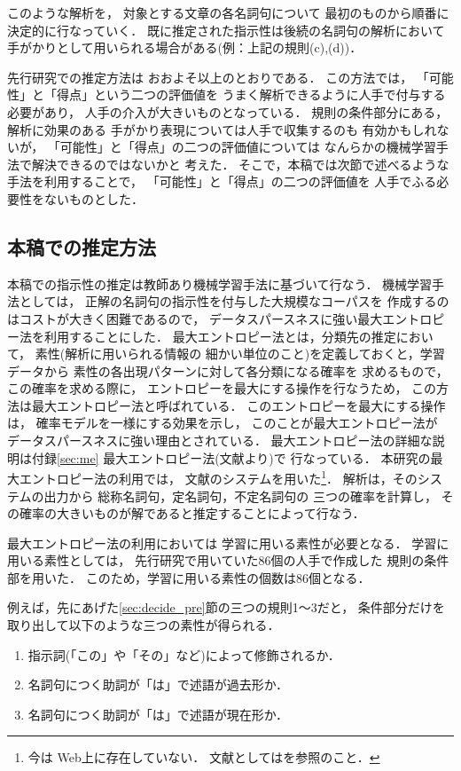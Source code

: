このような解析を，
対象とする文章の各名詞句について
最初のものから順番に決定的に行なっていく．
既に推定された指示性は後続の名詞句の解析において
手がかりとして用いられる場合がある(例：上記の規則(c),(d))．

先行研究での推定方法は
おおよそ以上のとおりである．
この方法では，
「可能性」と「得点」という二つの評価値を
うまく解析できるように人手で付与する必要があり，
人手の介入が大きいものとなっている．
規則の条件部分にある，解析に効果のある
手がかり表現については人手で収集するのも
有効かもしれないが，
「可能性」と「得点」の二つの評価値については
なんらかの機械学習手法で解決できるのではないかと
考えた．
そこで，本稿では次節で述べるような手法を利用することで，
「可能性」と「得点」の二つの評価値を
人手でふる必要性をないものとした．

\subsection{本稿での推定方法}\label{sec:decide_now}

本稿での指示性の推定は教師あり機械学習手法に基づいて行なう．
機械学習手法としては，
正解の名詞句の指示性を付与した大規模なコーパスを
作成するのはコストが大きく困難であるので，
データスパースネスに強い最大エントロピー法を利用することにした．
最大エントロピー法とは，分類先の推定において，
素性(解析に用いられる情報の
細かい単位のこと)を定義しておくと，学習データから
素性の各出現パターンに対して各分類になる確率を
求めるもので，
この確率を求める際に，
エントロピーを最大にする操作を行なうため，
この方法は最大エントロピー法と呼ばれている．
このエントロピーを最大にする操作は，
確率モデルを一様にする効果を示し，
このことが最大エントロピー法が
データスパースネスに強い理由とされている．
最大エントロピー法の詳細な説明は付録\ref{sec:me}
最大エントロピー法(文献\protect\cite{uchimoto:nlp99}より)で
行なっている．
本研究の最大エントロピー法の利用では，
文献\cite{ristad98}のシステムを用いた\footnote{今は
Web上に存在していない．
文献としては\cite{ristad97}を参照のこと．}．
解析は，そのシステムの出力から
総称名詞句，定名詞句，不定名詞句の
三つの確率を計算し，
その確率の大きいものが解であると推定することによって行なう．

最大エントロピー法の利用においては
学習に用いる素性が必要となる．
学習に用いる素性としては，
先行研究で用いていた86個の人手で作成した
規則の条件部を用いた．
このため，学習に用いる素性の個数は86個となる．

例えば，先にあげた\ref{sec:decide_pre}節の三つの規則1〜3だと，
条件部分だけを取り出して以下のような三つの素性が得られる．
\begin{enumerate}
\item 指示詞(「この」や「その」など)によって修飾されるか．
\item 名詞句につく助詞が「は」で述語が過去形か．
\item 名詞句につく助詞が「は」で述語が現在形か．
\end{enumerate}


